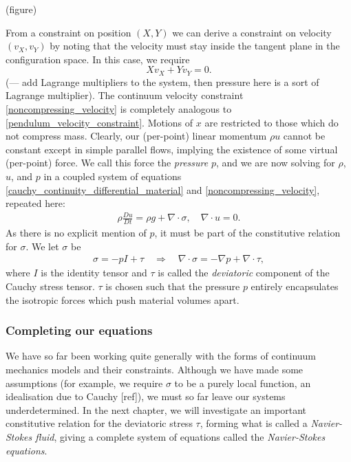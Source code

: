 \documentclass[11pt,a4paper]{memoir}
\begin{document}
\vskip 0.2in
(figure)
\vskip 0.2in

From a constraint on position $(X,Y)$ we can derive a constraint on velocity $(v_X,v_Y)$ by noting that the velocity must stay inside
the tangent plane in the configuration space. In this case, we require
\begin{equation}\label{pendulum_velocity_constraint}
    Xv_X + Yv_Y = 0.
\end{equation}
(--- add Lagrange multipliers to the system, then pressure here is a sort of Lagrange multiplier).
The continuum velocity constraint \eqref{noncompressing_velocity} is completely analogous to \eqref{pendulum_velocity_constraint}.
Motions of $x$ are restricted to those which do not compress mass. Clearly, our (per-point) linear momentum $\rho u$
cannot be constant except in simple parallel flows, implying the existence of some virtual (per-point) force.
We call this force the \textit{pressure} $p$, and we are now solving for $\rho$, $u$, and $p$ in a coupled system of equations
\eqref{cauchy_continuity_differential_material} and \eqref{noncompressing_velocity}, repeated here:
\begin{align*}
    \rho\frac{Du}{Dt} = \rho g + \nabla\cdot\sigma,\quad
        \nabla \cdot u = 0.
\end{align*}
As there is no explicit mention of $p$, it must be part of the constitutive relation for $\sigma$.
We let $\sigma$ be
\begin{align*}
    \sigma = -pI + \tau \quad\Rightarrow\quad \nabla\cdot\sigma = -\nabla p + \nabla\cdot \tau,
\end{align*}
where $I$ is the identity tensor and $\tau$ is called the \textit{deviatoric} component of the Cauchy stress tensor.
$\tau$ is chosen such that the pressure $p$ entirely encapsulates the isotropic forces which push material volumes apart.

\subsubsection{Completing our equations}
We have so far been working quite generally with the forms of continuum mechanics models and their constraints. Although we have made some assumptions
(for example, we require $\sigma$ to be a purely local function, an idealisation due to Cauchy [ref]), we must so far leave
our systems underdetermined.
In the next chapter, we will
investigate an important constitutive relation for the deviatoric stress $\tau$, forming what is called a \textit{Navier-Stokes fluid},
giving a complete system of equations called the \textit{Navier-Stokes equations}.
\end{document}
